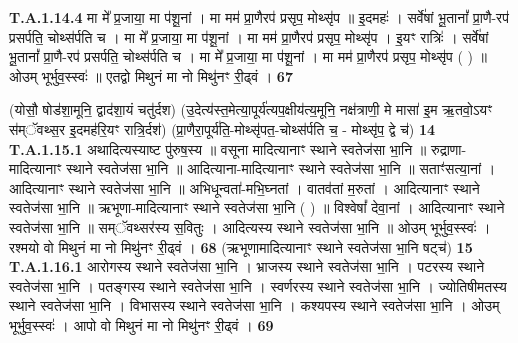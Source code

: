 \documentclass[17pt]{extarticle}
\begin{document}
                  \newline
                                                                  \textbf{ T.A.1.14.4} \newline
                  मा मे᳚ प्र॒जाया॒ मा प॑शू॒नां । मा मम॑ प्रा॒णैरप॑ प्रसृप॒ मोथ्सृ॑प ॥  इ॒दमहः॑ । सर्वे॑षां भू॒तानां᳚ प्रा॒णै-रप॑ प्रसर्पति॒ चोथ्स॑र्पति च ।  मा मे᳚ प्र॒जाया॒ मा प॑शू॒नां । मा मम॑ प्रा॒णैरप॑ प्रसृप॒ मोथ्सृ॑प ।  इ॒यꣳ रात्रिः॑ । सर्वे॑षां भू॒तानां᳚ प्रा॒णै-रप॑ प्रसर्पति॒ चोथ्स॑र्पति च ।  मा मे᳚ प्र॒जाया॒ मा प॑शू॒नां । मा मम॑ प्रा॒णैरप॑ प्रसृप॒ मोथ्सृ॑प ( ) ॥  ओउम् भूर्भुव॒स्स्वः॑ ॥ एतद्वो मिथुनं मा नो मिथु॑नꣳ री॒ढ्वं । \textbf{ 67} \newline
                  \newline
                                                  
                (योसौ॒ षोड॑शा॒मूनि॒ द्वाद॑शा॒यं चतु॑र्दश)  (उ॒देत्य॑स्त॒मेत्या॒पूर्य॑त्यप॒क्षीय॑त्य॒मूनि॒ नक्ष॑त्राणी॒ मे मासा॑ इ॒म ऋ॒तवो॒ऽयꣳ स॑म्ॅवथ्स॒र इ॒दमह॑रि॒यꣳ रात्रि॒र्दश॑) \newline
                                      (प्रा॒णैरा॒पूर्य॑ति॒-मोथ्सृ॑पत॒-चोथ्स॑र्पति च॒ - मोथ्सृ॑प॒ द्वे च॑) \textbf{14} \newline \newline
                                \textbf{ T.A.1.15.1} \newline
                  अथादित्यस्याष्ट पु॑रुष॒स्य ॥  वसूना मादित्यानाꣳ स्थाने स्वतेज॑सा भा॒नि ॥  रुद्राणा-मादित्यानाꣳ स्थाने स्वतेज॑सा भा॒नि ॥  आदित्याना-मादित्यानाꣳ स्थाने स्वतेज॑सा भा॒नि ॥ सताꣳ॑सत्या॒नां । आदित्यानाꣳ स्थाने स्वतेज॑सा भा॒नि ॥ अभिधून्वता॑-मभि॒घ्नतां । वातव॑तां म॒रुतां । आदित्यानाꣳ स्थाने स्वतेज॑सा भा॒नि ॥  ऋभूणा-मादित्यानाꣳ स्थाने स्वतेज॑सा भा॒नि ( ) ॥  विश्वेषां᳚ देवा॒नां । आदित्यानाꣳ स्थाने स्वतेज॑सा भा॒नि ॥ सम्ॅवथ्सर॑स्य स॒वितुः । आदित्यस्य स्थाने स्वतेज॑सा भा॒नि ॥ ओउम् भूर्भुव॒स्स्वः॑ ।  रश्मयो वो मिथुनं मा नो मिथु॑नꣳ री॒ढ्वं । \textbf{ 68} \newline
                  \newline
                                                        (ऋभूणामादित्यानाꣳ स्थाने स्वतेज॑सा भा॒नि षट्च॑) \textbf{15} \newline \newline
                                \textbf{ T.A.1.16.1} \newline
                  आरोगस्य स्थाने स्वतेज॑सा भा॒नि । भ्राजस्य स्थाने स्वतेज॑सा भा॒नि । पटरस्य स्थाने स्वतेज॑सा भा॒नि । पतङ्गस्य स्थाने स्वतेज॑सा भा॒नि ।  स्वर्णरस्य स्थाने स्वतेज॑सा भा॒नि ।  ज्योतिषीमतस्य स्थाने स्वतेज॑सा भा॒नि ।  विभासस्य स्थाने स्वतेज॑सा भा॒नि ।  कश्यपस्य स्थाने स्वतेज॑सा भा॒नि । ओउम् भूर्भुव॒स्स्वः॑ । आपो वो मिथुनं मा नो मिथु॑नꣳ री॒ढ्वं । \textbf{ 69} \newline
\end{document}
